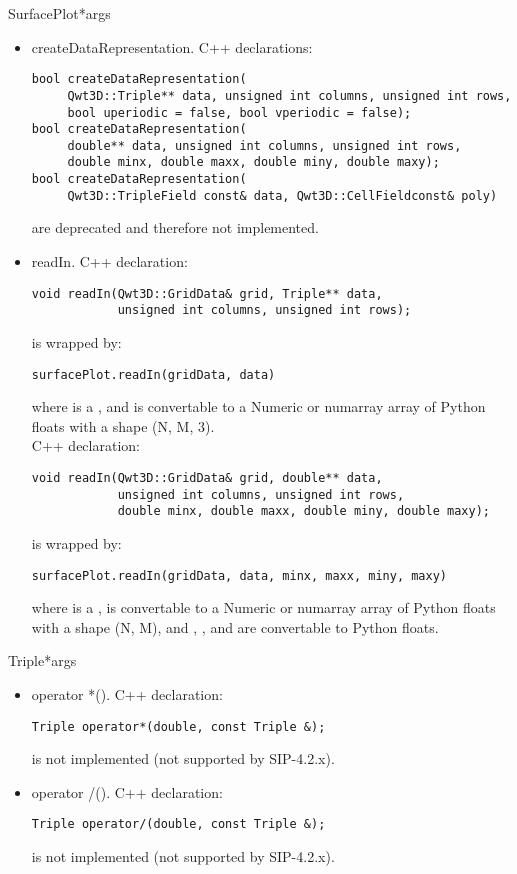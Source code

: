 \documentclass{manual}
\begin{document}
\begin{classdesc}{SurfacePlot}{*args}
\begin{itemize}
    .
  \item{createDataRepresentation}. C++ declarations:
\begin{verbatim}
bool createDataRepresentation(
     Qwt3D::Triple** data, unsigned int columns, unsigned int rows,
     bool uperiodic = false, bool vperiodic = false);
bool createDataRepresentation(
     double** data, unsigned int columns, unsigned int rows,
     double minx, double maxx, double miny, double maxy);
bool createDataRepresentation(
     Qwt3D::TripleField const& data, Qwt3D::CellFieldconst& poly)
\end{verbatim}
    are deprecated and therefore not implemented.
  \item{readIn}. C++ declaration:
\begin{verbatim}
void readIn(Qwt3D::GridData& grid, Triple** data,
            unsigned int columns, unsigned int rows);
\end{verbatim}
    is wrapped by:
\begin{verbatim}
surfacePlot.readIn(gridData, data) 
\end{verbatim}
    where  is a , and  is convertable
    to a Numeric or numarray array of Python floats with a shape (N, M, 3).\\
    C++ declaration:
\begin{verbatim}
void readIn(Qwt3D::GridData& grid, double** data,
            unsigned int columns, unsigned int rows,
            double minx, double maxx, double miny, double maxy);
\end{verbatim}
    is wrapped by:
\begin{verbatim}
surfacePlot.readIn(gridData, data, minx, maxx, miny, maxy)
\end{verbatim}
    where  is a ,  is convertable to
    a Numeric or numarray array of Python floats with a shape (N, M), and
    , ,  and  are convertable to Python
    floats.
  \end{itemize}
\end{classdesc}

\begin{classdesc}{Triple}{*args}
  \begin{itemize}
  \item{operator *()}. C++ declaration:
\begin{verbatim}
Triple operator*(double, const Triple &);
\end{verbatim}
    is not implemented (not supported by SIP-4.2.x).
  \item{operator /()}. C++ declaration:
\begin{verbatim}
Triple operator/(double, const Triple &);
\end{verbatim}
    is not implemented (not supported by SIP-4.2.x).
  \end{itemize}
\end{classdesc}
\end{document}
